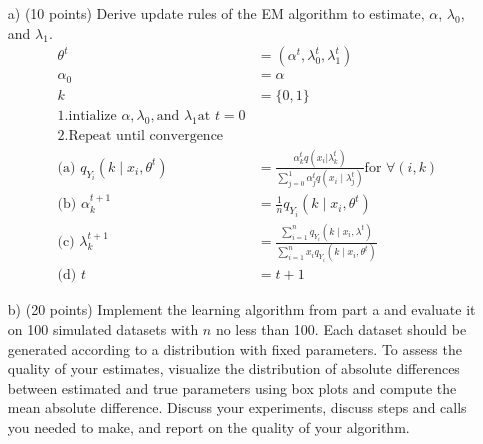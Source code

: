 \documentclass[a4 paper]{article}
\begin{document}
	\begin{enumerate}
	\item[a)] (10 points) Derive update rules of the EM algorithm to estimate, $\alpha$, $\lambda_0$, and $\lambda_1$.
	\begin{equation*}
	\begin{split}
	\theta^t &= ( \alpha^t, \lambda_0^t, \lambda_1^t) \\
	\alpha_0 &= \alpha \\  
	k & = \{0, 1\} \\
	1. \text{intialize } \alpha, \lambda_0, \text{and } \lambda_1 \text{at } t=0 \\
	2. \text{Repeat until convergence } \\ 
	\text{(a) } q_{Y_i} (k \mid x_i, \theta^t) & = \frac{\alpha_k^t q(x_i|\lambda_k^t)}{\sum_{j=0}^1 \alpha_j^t q(x_i \mid \lambda_j^t)} \text{for } \forall (i,k) \\
	\text{(b) } \alpha_k^{t+1} & = \frac{1}{n} q_{Y_i}(k \mid x_i, \theta^t) \\
	\text{(c) } \lambda_k^{t+1} & = \frac{\sum_{i=1}^n q_{Y_i}(k \mid x_i,\lambda^t)}{\sum_{i=1}^n x_i q_{Y_i}(k \mid x_i, \theta^t)} \\
	\text{(d) } t & = t + 1
	\end{split}
	\end{equation*}
	\item[b)] (20 points) Implement the learning algorithm from part a and evaluate it on 100 simulated datasets with $n$ no less than 100. Each dataset should be generated according to a distribution with fixed parameters. To assess the quality of your estimates, visualize the distribution of absolute differences between estimated and true parameters using box plots and compute the mean absolute difference. Discuss your experiments, discuss steps and calls you needed to make, and report on the quality of your algorithm.
	\end{enumerate}
\end{document}
